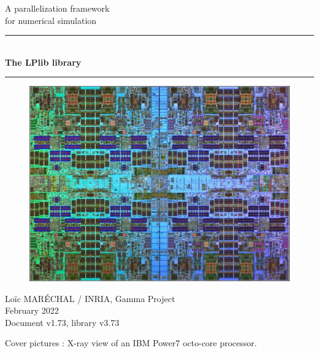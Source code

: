 \documentclass[a4paper,12pt]{article}
\newcommand{\HRule}{\rule{\linewidth}{1mm}}
\begin{document}
%
%

\begin{titlepage}

\begin{center}
\huge A parallelization framework\\ for numerical simulation
\HRule \\
\medskip
{\Huge \bfseries The LPlib library} \\
\HRule
\end{center}


\begin{figure}[htbp]
\begin{center}
\includegraphics[width=12cm]{power7.pdf}
\end{center}
\end{figure}


\begin{flushright}
\Large Lo\"ic MAR\'ECHAL / INRIA, Gamma Project\\
\Large February 2022 \\
\normalsize Document v1.73, library v3.73
\end{flushright}

\end{titlepage}

\clearpage

\setcounter{tocdepth}{2}
\tableofcontents
\vfill

\footnotesize{Cover pictures : X-ray view of an IBM Power7 octo-core processor.}
\normalsize
\end{document}
